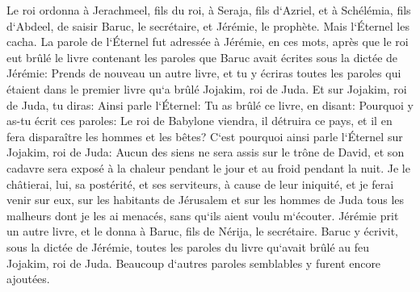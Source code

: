 \verse Le roi ordonna à Jerachmeel, fils du roi, à Seraja, fils d`Azriel, et à Schélémia, fils d`Abdeel, de saisir Baruc, le secrétaire, et Jérémie, le prophète. Mais l`Éternel les cacha. 
\verse La parole de l`Éternel fut adressée à Jérémie, en ces mots, après que le roi eut brûlé le livre contenant les paroles que Baruc avait écrites sous la dictée de Jérémie: 
\verse Prends de nouveau un autre livre, et tu y écriras toutes les paroles qui étaient dans le premier livre qu`a brûlé Jojakim, roi de Juda. 
\verse Et sur Jojakim, roi de Juda, tu diras: Ainsi parle l`Éternel: Tu as brûlé ce livre, en disant: Pourquoi y as-tu écrit ces paroles: Le roi de Babylone viendra, il détruira ce pays, et il en fera disparaître les hommes et les bêtes? 
\verse C`est pourquoi ainsi parle l`Éternel sur Jojakim, roi de Juda: Aucun des siens ne sera assis sur le trône de David, et son cadavre sera exposé à la chaleur pendant le jour et au froid pendant la nuit. 
\verse Je le châtierai, lui, sa postérité, et ses serviteurs, à cause de leur iniquité, et je ferai venir sur eux, sur les habitants de Jérusalem et sur les hommes de Juda tous les malheurs dont je les ai menacés, sans qu`ils aient voulu m`écouter. 
\verse Jérémie prit un autre livre, et le donna à Baruc, fils de Nérija, le secrétaire. Baruc y écrivit, sous la dictée de Jérémie, toutes les paroles du livre qu`avait brûlé au feu Jojakim, roi de Juda. Beaucoup d`autres paroles semblables y furent encore ajoutées. 


